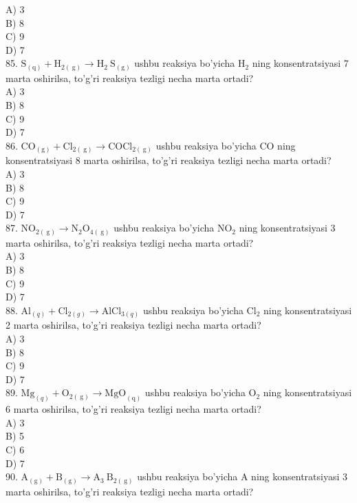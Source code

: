 A) 3\\
B) 8\\
C) 9\\
D) 7\\
85. $\mathrm{S}_{(\mathrm{q})}+\mathrm{H}_{2(\mathrm{~g})} \rightarrow \mathrm{H}_{2} \mathrm{~S}_{(\mathrm{g})}$ ushbu reaksiya bo'yicha $\mathrm{H}_{2}$ ning konsentratsiyasi 7 marta oshirilsa, to'g'ri reaksiya tezligi necha marta ortadi?\\
A) 3\\
B) 8\\
C) 9\\
D) 7\\
86. $\mathrm{CO}_{(\mathrm{g})}+\mathrm{Cl}_{2(\mathrm{~g})} \rightarrow \mathrm{COCl}_{2(\mathrm{~g})}$ ushbu reaksiya bo'yicha CO ning konsentratsiyasi 8 marta oshirilsa, to'g'ri reaksiya tezligi necha marta ortadi?\\
A) 3\\
B) 8\\
C) 9\\
D) 7\\
87. $\mathrm{NO}_{2(\mathrm{~g})} \rightarrow \mathrm{N}_{2} \mathrm{O}_{4(\mathrm{~g})}$ ushbu reaksiya bo'yicha $\mathrm{NO}_{2}$ ning konsentratsiyasi 3 marta oshirilsa, to'g'ri reaksiya tezligi necha marta ortadi?\\
A) 3\\
B) 8\\
C) 9\\
D) 7\\
88. $\mathrm{Al}_{(q)}+\mathrm{Cl}_{2(g)} \rightarrow \mathrm{AlCl}_{3(q)}$ ushbu reaksiya bo'yicha $\mathrm{Cl}_{2}$ ning konsentratsiyasi 2 marta oshirilsa, to'g'ri reaksiya tezligi necha marta ortadi?\\
A) 3\\
B) 8\\
C) 9\\
D) 7\\
89. $\mathrm{Mg}_{(q)}+\mathrm{O}_{2(\mathrm{~g})} \rightarrow \mathrm{MgO}_{(\mathrm{q})}$ ushbu reaksiya bo'yicha $\mathrm{O}_{2}$ ning konsentratsiyasi 6 marta oshirilsa, to'g'ri reaksiya tezligi necha marta ortadi?\\
A) 3\\
B) 5\\
C) 6\\
D) 7\\
90. $\mathrm{A}_{(\mathrm{g})}+\mathrm{B}_{(\mathrm{g})} \rightarrow \mathrm{A}_{3} \mathrm{~B}_{2(\mathrm{~g})}$ ushbu reaksiya bo'yicha A ning konsentratsiyasi 3 marta oshirilsa, to'g'ri reaksiya tezligi necha marta ortadi?\\
